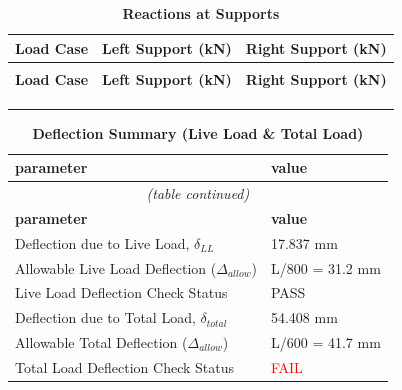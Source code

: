 \documentclass[12pt,a4paper]{report}
\numberwithin{table}{chapter}
\numberwithin{figure}{chapter}
\begin{document}
\vspace{1em}
\begin{longtable}{|>{\centering\arraybackslash}p{5.2cm}|>{\centering\arraybackslash}p{5.2cm}|>{\centering\arraybackslash}p{5.2cm}|}
\caption{\textbf{Reactions at Supports}} \\
\hline
\textbf{Load Case} & \textbf{Left Support (kN)} & \textbf{Right Support (kN)} \\[6pt]
\hline
\endfirsthead
\hline
\multicolumn{3}{c|}{\footnotesize\textit{(table continued)}} \\
\hline
\textbf{Load Case} & \textbf{Left Support (kN)} & \textbf{Right Support (kN)} \\[6pt]
\hline
\endhead
 &  &  \\[6pt]
\hline
 &  &  \\[6pt]
\hline
 &  &  \\[6pt]
\hline
\end{longtable}

\vspace{1em}
\begin{longtable}{|L{7cm}|p{8.5cm}|}
\caption{\textbf{Deflection Summary (Live Load \& Total Load)}} \\
\hline
\textbf{parameter} & \textbf{value} \\
\hline
\endfirsthead
\hline
{} \\
\hline
\textbf{parameter} & \textbf{value} \\
\hline
\endhead
\textnormal{Deflection due to Live Load, $\delta_{LL}$} & 17.837 mm \\[6pt]
\hline
\textnormal{Allowable Live Load Deflection ($\Delta_{allow}$)} & L/800 = 31.2 mm \\[6pt]
\hline
\textnormal{Live Load Deflection Check Status} & PASS \\[6pt]
\hline
\textnormal{Deflection due to Total Load, $\delta_{total}$} & 54.408 mm \\[6pt]
\hline
\textnormal{Allowable Total Deflection ($\Delta_{allow}$)} & L/600 = 41.7 mm \\[6pt]
\hline
\textnormal{Total Load Deflection Check Status} & \textcolor{red}{FAIL} \\[6pt]
\hline
\end{longtable}
\end{document}
